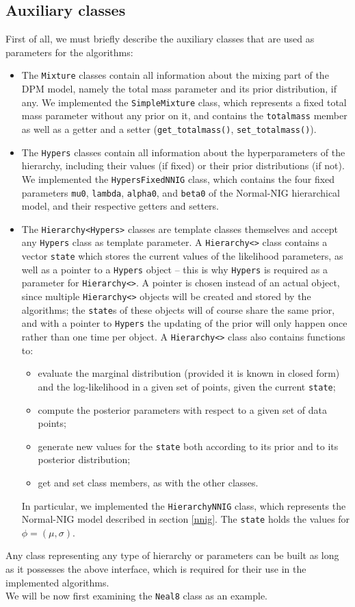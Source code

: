 \subsection{Auxiliary classes}
First of all, we must briefly describe the auxiliary classes that are used as parameters for the algorithms:
\begin{itemize}
	\item The \verb|Mixture| classes contain all information about the mixing part of the DPM model, namely the total mass parameter and its prior distribution, if any.
	We implemented the \verb|SimpleMixture| class, which represents a fixed total mass parameter without any prior on it, and contains the \verb|totalmass| member as well as a getter and a setter (\verb|get_totalmass()|, \verb|set_totalmass()|).
	\item The \verb|Hypers| classes contain all information about the hyperparameters of the hierarchy, including their values (if fixed) or their prior distributions (if not).
	We implemented the \verb|HypersFixedNNIG| class, which contains the four fixed parameters \verb|mu0|, \verb|lambda|, \verb|alpha0|, and \verb|beta0| of the Normal-NIG hierarchical model, and their respective getters and setters.
	\item The \verb|Hierarchy<Hypers>| classes are template classes themselves and accept any \verb|Hypers| class as template parameter.
	A \verb|Hierarchy<>| class contains a vector \verb|state| which stores the current values of the likelihood parameters, as well as a pointer to a \verb|Hypers| object -- this is why \verb|Hypers| is required as a parameter for \verb|Hierarchy<>|.
	A pointer is chosen instead of an actual object, since multiple \verb|Hierarchy<>| objects will be created and stored by the algorithms; the \verb|state|s of these objects will of course share the same prior, and with a pointer to \verb|Hypers| the updating of the prior will only happen once rather than one time per object.
	A \verb|Hierarchy<>| class also contains functions to:
	\begin{itemize}
		\item evaluate the marginal distribution (provided it is known in closed form) and the log-likelihood in a given set of points, given the current \verb|state|;
		\item compute the posterior parameters with respect to a given set of data points;
		\item generate new values for the \verb|state| both according to its prior and to its posterior distribution;
		\item get and set class members, as with the other classes.
	\end{itemize}
	In particular, we implemented the \verb|HierarchyNNIG| class, which represents the Normal-NIG model described in section \ref{nnig}.
	The \verb|state| holds the values for $\phi = (\mu,\sigma)$.
\end{itemize}
Any class representing any type of hierarchy or parameters can be built as long as it possesses the above interface, which is required for their use in the implemented algorithms. \\
We will be now first examining the \verb|Neal8| class as an example.

